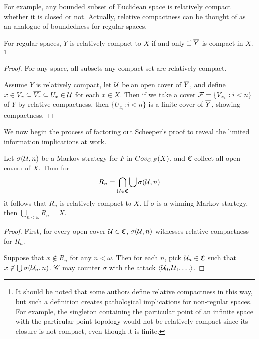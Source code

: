 For example, any bounded subset of Euclidean space is relatively compact
whether it is closed or not. Actually, relative compactness can be thought
of as an analogue of boundedness for regular spaces.

\begin{prop}
  For regular spaces, $Y$ is relatively compact to $X$ if and only if
  $\overline{Y}$ is compact in $X$.
  \footnote{
    It should be noted that some authors define relative compactness in
    this way, but such a definition creates pathological implications for
    non-regular spaces. For example, the singleton containing
    the particular point of an infinite space with the particular point topology
    would not be relatively compact since its closure is not compact, even
    though it is finite.
  }
\end{prop}

\begin{proof}
  For any space, all subsets any compact set are relatively compact.

  Assume $Y$ is relatively compact, let $\mathcal{U}$ be an open cover of $\overline{Y}$,
  and define $x\in V_x\subseteq \overline{V_x}\subseteq U_x \in \mathcal{U}$ for each
  $x\in X$. Then if we take a cover $\mathcal{F} = \{V_{x_i} : i<n\}$ of $Y$ by
  relative compactness, then $\{U_{x_i}:i<n\}$ is a finite cover of $\overline{Y}$,
  showing compactness.
\end{proof}

We now begin the process of factoring out Scheeper's proof to reveal the
limited information implications at work.

\begin{lem}
  Let $\sigma(\mathcal{U}, n)$ be a Markov strategy for $F$ in
  $Cov_{C,F}(X)$, and $\mathfrak{C}$ collect all open covers of $X$. Then for
    \[
      R_n = \bigcap_{\mathcal{U}\in\mathfrak{C}} \bigcup\sigma(\mathcal{U},n)
    \]
  it follows that $R_n$ is relatively compact to $X$. If $\sigma$ is a winning
  Markov startegy, then $\bigcup_{n<\omega} R_n = X$.
\end{lem}

\begin{proof}
  First, for every open cover $\mathcal{U}\in\mathfrak C$, $\sigma(\mathcal{U},n)$
  witnesses relative compactness for $R_n$.

  Suppose that $x \not\in R_n$ for any $n<\omega$. Then for each $n$,
  pick $\mathcal{U}_n\in\mathfrak{C}$ such that $x\not\in \bigcup\sigma(\mathcal{U}_n,n)$.
  $\mathscr{C}$ may counter $\sigma$ with the attack $\<\mc U_0,\mc U_1,\dots\>$.
\end{proof}

